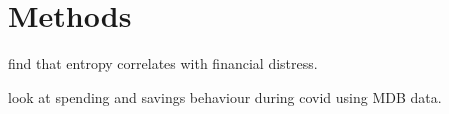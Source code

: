 
\section{Methods}%
\label{sec:methods}

\citet{muggleton2020evidence} find that entropy correlates with financial
distress.

\citet{davenport2020spending} look at spending and savings behaviour during
covid using MDB data.


